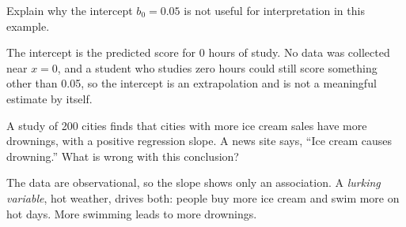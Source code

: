 \begin{Exercise}[label=slr3, title=Interpret the intercept]
Explain why the intercept $b_0 = 0.05$ is not useful for interpretation in this example.
\end{Exercise}
\begin{Answer}[ref=slr3]
The intercept is the predicted score for 0 hours of study. No data was collected
near $x = 0$, and a student who studies zero hours could still score something
other than 0.05, so the intercept is an extrapolation and is not a meaningful
estimate by itself.
\end{Answer}

\begin{Exercise}[label=slr4, title=Spot the problem]
A study of 200 cities finds that cities with more ice cream sales have more
drownings, with a positive regression slope. A news site says, ``Ice cream
causes drowning.'' What is wrong with this conclusion?
\end{Exercise}
\begin{Answer}[ref=slr4]
The data are observational, so the slope shows only an association. A
\textit{lurking variable}, hot weather, drives both: people buy more ice cream
and swim more on hot days. More swimming leads to more drownings.
\end{Answer}

